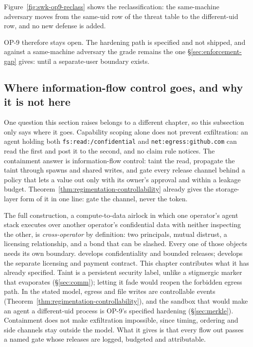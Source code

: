 \documentclass[11pt,a4paper]{article}
\theoremstyle{definition}
\theoremstyle{remark}
\begin{document}


Figure~\ref{fig:swk-op9-reclass} shows the reclassification: the same-machine
adversary moves from the same-uid row of the threat table to the different-uid row,
and no new defense is added.

\noindent OP-9 therefore stays open. The hardening path is specified and not
shipped, and against a same-machine adversary the grade remains the one
\S\ref{sec:enforcement-gap} gives: \NotGuar{} until a separate-user boundary
exists.

\subsection{Where information-flow control goes, and why it is not here}
\label{sec:ifc-airlock}

One question this section raises belongs to a different chapter, so this
subsection only says where it goes. Capability
scoping alone does not prevent exfiltration: an agent holding both
\texttt{fs:read:/confidential} and \texttt{net:egress:github.com} can read the first
and post it to the second, and no claim rule notices. The
containment answer is information-flow control: taint the read, propagate the
taint through spawns and shared writes, and gate every release channel behind a
policy that lets a value out only with its owner's approval and within a
leakage budget. Theorem~\ref{thm:regimentation-controllability}
already gives the storage-layer form of it in one line: gate the channel, never
the token.

The full construction, a compute-to-data airlock in which one operator's agent
stack executes over another operator's confidential data with neither inspecting
the other, is \emph{cross-operator} by definition: two principals, mutual
distrust, a licensing relationship, and a bond that can be slashed. Every one of
those objects needs its own boundary. 
develops confidentiality and bounded releases; 
develops the separate licensing and payment contract. This chapter contributes what
it has already specified. Taint is a persistent security label, unlike a stigmergic
marker that evaporates (\S\ref{sec:comm}); letting it fade would reopen the forbidden
egress path. In the stated model, egress and file writes are controllable events
(Theorem~\ref{thm:regimentation-controllability}), and the sandbox that would make an
agent a different-uid process is OP-9's specified hardening (\S\ref{sec:merkle}).
Containment does not make exfiltration impossible, since timing, ordering and side
channels stay outside the model. What it gives is that every flow out passes a
named gate whose releases are logged, budgeted and attributable.
\end{document}
